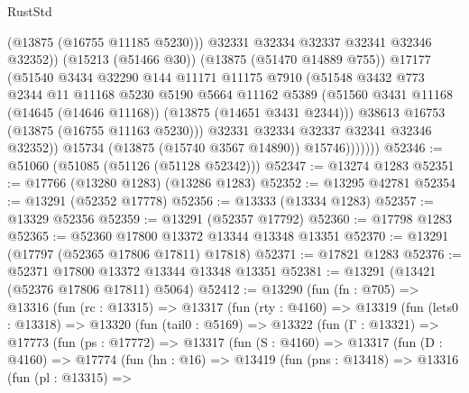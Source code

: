 \begin{lexlean}{RustStd}
\begin{coremodule}
                          (@13875 (@16755 @11185 @5230)))
                        @32331
                        @32334
                        @32337
                        @32341
                        @32346
                        @32352))
                    (@15213 (@51466 @30))
                    (@13875 (@51470 @14889 @755))
                    @17177
                    (@51540
                      @3434
                      @32290
                      @144
                      @11171
                      @11175
                      @7910
                      (@51548
                        @3432
                        @773
                        @2344
                        @11
                        @11168
                        @5230
                        @5190
                        @5664
                        @11162
                        @5389
                        (@51560 @3431 @11168 (@14645 (@14646 @11168)) (@13875 (@14651 @3431 @2344)))
                        @38613
                        @16753
                        (@13875 (@16755 @11163 @5230)))
                      @32331
                      @32334
                      @32337
                      @32341
                      @32346
                      @32352))
                  @15734
                  (@13875 (@15740 @3567 @14890))
                  @15746)))))))
@52346 := @51060 (@51085 (@51126 (@51128 @52342)))
@52347 := @13274 @1283
@52351 := @17766 (@13280 @1283) (@13286 @1283)
@52352 := @13295 @42781
@52354 := @13291 (@52352 @17778)
@52356 := @13333 (@13334 @1283)
@52357 := @13329 @52356
@52359 := @13291 (@52357 @17792)
@52360 := @17798 @1283
@52365 := @52360 @17800 @13372 @13344 @13348 @13351
@52370 := @13291 (@17797 (@52365 @17806 @17811) @17818)
@52371 := @17821 @1283
@52376 := @52371 @17800 @13372 @13344 @13348 @13351
@52381 := @13291 (@13421 (@52376 @17806 @17811) @5064)
@52412 := @13290
    (fun (fn : @705) =>
    @13316
      (fun (rc : @13315) =>
      @13317
        (fun (rty : @4160) =>
        @13319
          (fun (lets0 : @13318) =>
          @13320
            (fun (tail0 : @5169) =>
            @13322
              (fun (Γ : @13321) =>
              @17773
                (fun (ps : @17772) =>
                @13317
                  (fun (S : @4160) =>
                  @13317
                    (fun (D : @4160) =>
                    @17774
                      (fun (hn : @16) =>
                      @13419
                        (fun (pns : @13418) =>
                        @13316
                          (fun (pl : @13315) =>

\end{coremodule}
\end{lexlean}
